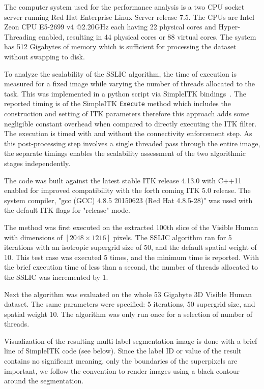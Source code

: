 \documentclass{InsightArticle}
\begin{document}
The computer system used for the performance analysis is a two CPU socket
server running Red Hat Enterprise Linux Server release 7.5. The CPUs are Intel 
Zeon CPU E5-2699 v4 @2.20GHz each having 22 physical cores and Hyper-Threading
enabled, resulting in 44 physical cores or 88 virtual cores. The
system has 512 Gigabytes of memory which is sufficient for processing the
dataset without swapping to disk.


To analyze the scalability of the SSLIC algorithm, the time of execution is
measured for a fixed image while varying the number of threads allocated to the
task. This was implemented in a python script via SimpleITK
bindings~\cite{lowekamp2013}. The reported timing is of the SimpleITK
\texttt{Execute} method which includes the construction and setting of ITK
parameters therefore this approach adds some negligible constant overhead when compared to directly
executing the ITK filter. The execution is timed with and without the
connectivity enforcement step. As this post-processing step involves a single
threaded pass through the entire image, the separate timings enables the
scalability assessment of the two algorithmic stages independently.

The code was built against the latest stable ITK release 4.13.0 with C++11
enabled for improved compatibility with the forth coming ITK 5.0 release. The
system compiler, "gcc (GCC) 4.8.5 20150623 (Red Hat 4.8.5-28)" was used with the
default ITK flags for "release" mode.

The method was first executed on the extracted 100th slice of the Visible
Human with dimensions of $[2048 \times 1216 ]$ pixels. The SSLIC algorithm ran
for 5 iterations with an isotropic supergrid size of 50, and the default spatial
weight of 10. This test case was executed 5 times, and the minimum time is
reported. With the brief execution time of less than a second, the number of
threads allocated to the SSLIC was incremented by 1.


Next the algorithm was evaluated on the whole 53 Gigabyte 3D Visible Human
dataset. The same parameters were specified: 5 iterations, 50 supergrid size,
and spatial weight 10. The algorithm was only run once for a selection of number
of threads.

Visualization of the resulting multi-label segmentation image is done with a
brief line of SimpleITK code (see below). Since the label ID or value of the
result contains no significant meaning, only the boundaries of the superpixels
are important, we follow the convention to render images using a
black contour around the segmentation.
\end{document}

